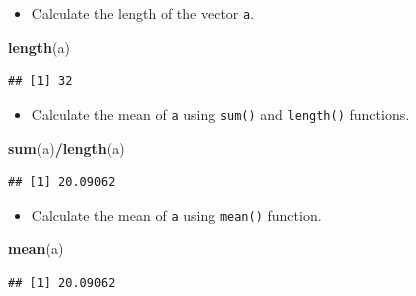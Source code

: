 \documentclass[]{book}
\newenvironment{Shaded}{\begin{snugshade}}{\end{snugshade}}
\newcommand{\KeywordTok}[1]{\textcolor[rgb]{0.13,0.29,0.53}{\textbf{#1}}}
\newcommand{\NormalTok}[1]{#1}
\newcommand{\OperatorTok}[1]{\textcolor[rgb]{0.81,0.36,0.00}{\textbf{#1}}}
\newcommand{\StringTok}[1]{\textcolor[rgb]{0.31,0.60,0.02}{#1}}
\providecommand{\tightlist}{%
  \setlength{\itemsep}{0pt}\setlength{\parskip}{0pt}}
\begin{document}
\begin{Shaded}
\end{Shaded}

\begin{itemize}
\tightlist
\item
  Calculate the length of the vector \texttt{a}.
\end{itemize}

\begin{Shaded}
\begin{Highlighting}[]
\KeywordTok{length}\NormalTok{(a)}
\end{Highlighting}
\end{Shaded}

\begin{verbatim}
## [1] 32
\end{verbatim}

\begin{itemize}
\tightlist
\item
  Calculate the mean of \texttt{a} using \texttt{sum()} and \texttt{length()} functions.
\end{itemize}

\begin{Shaded}
\begin{Highlighting}[]
\KeywordTok{sum}\NormalTok{(a)}\OperatorTok{/}\KeywordTok{length}\NormalTok{(a)}
\end{Highlighting}
\end{Shaded}

\begin{verbatim}
## [1] 20.09062
\end{verbatim}

\begin{itemize}
\tightlist
\item
  Calculate the mean of \texttt{a} using \texttt{mean()} function.
\end{itemize}

\begin{Shaded}
\begin{Highlighting}[]
\KeywordTok{mean}\NormalTok{(a)}
\end{Highlighting}
\end{Shaded}

\begin{verbatim}
## [1] 20.09062
\end{verbatim}
\end{document}
